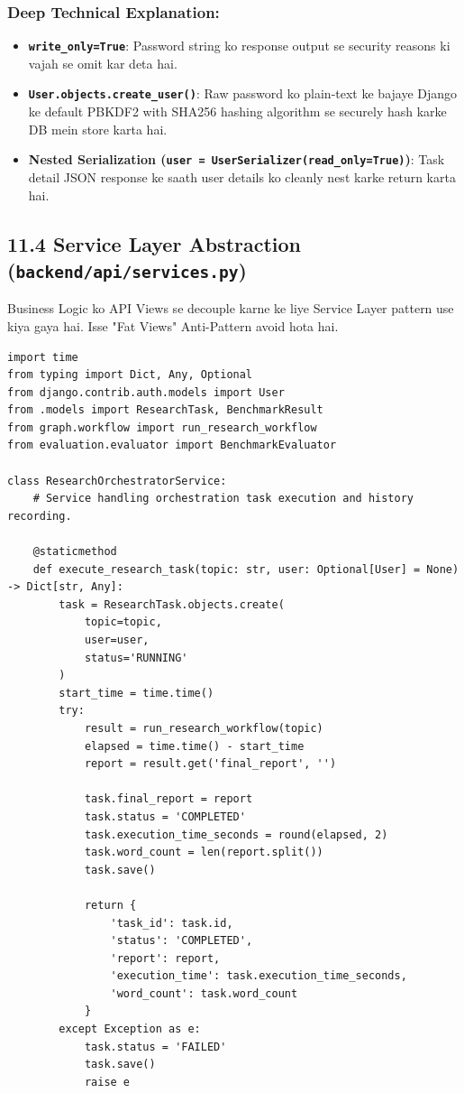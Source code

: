 \documentclass[12pt, a4paper]{article}
\begin{document}
\subsubsection{Deep Technical Explanation:}
\begin{itemize}
    \item \textbf{\texttt{write\_only=True}}: Password string ko response output se security reasons ki vajah se omit kar deta hai.
    \item \textbf{\texttt{User.objects.create\_user()}}: Raw password ko plain-text ke bajaye Django ke default PBKDF2 with SHA256 hashing algorithm se securely hash karke DB mein store karta hai.
    \item \textbf{Nested Serialization (\texttt{user = UserSerializer(read\_only=True)})}: Task detail JSON response ke saath user details ko cleanly nest karke return karta hai.
\end{itemize}

\clearpage
\subsection{11.4 Service Layer Abstraction (\texttt{backend/api/services.py})}

Business Logic ko API Views se decouple karne ke liye Service Layer pattern use kiya gaya hai. Isse "Fat Views" Anti-Pattern avoid hota hai.

\begin{lstlisting}[style=pythonstyle, caption={backend/api/services.py --- Business Logic Layer}]
import time
from typing import Dict, Any, Optional
from django.contrib.auth.models import User
from .models import ResearchTask, BenchmarkResult
from graph.workflow import run_research_workflow
from evaluation.evaluator import BenchmarkEvaluator

class ResearchOrchestratorService:
    # Service handling orchestration task execution and history recording.

    @staticmethod
    def execute_research_task(topic: str, user: Optional[User] = None) -> Dict[str, Any]:
        task = ResearchTask.objects.create(
            topic=topic,
            user=user,
            status='RUNNING'
        )
        start_time = time.time()
        try:
            result = run_research_workflow(topic)
            elapsed = time.time() - start_time
            report = result.get('final_report', '')
            
            task.final_report = report
            task.status = 'COMPLETED'
            task.execution_time_seconds = round(elapsed, 2)
            task.word_count = len(report.split())
            task.save()
            
            return {
                'task_id': task.id,
                'status': 'COMPLETED',
                'report': report,
                'execution_time': task.execution_time_seconds,
                'word_count': task.word_count
            }
        except Exception as e:
            task.status = 'FAILED'
            task.save()
            raise e
\end{lstlisting}
\end{document}
